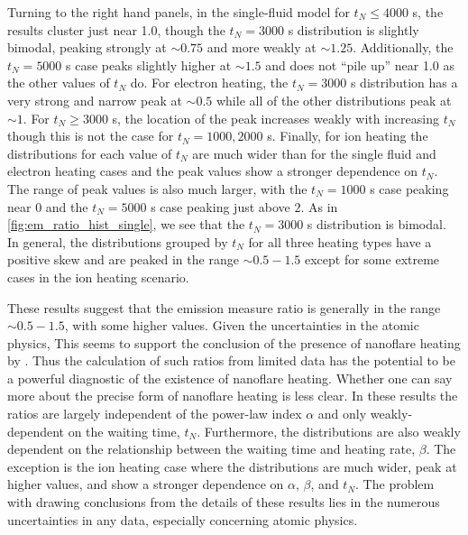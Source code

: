 \documentclass[preprint,linenumbers]{aastex}
\begin{document}
	\par Turning to the right hand panels, in the single-fluid model for $t_N\le4000$ s, the results cluster just near 1.0, though the $t_N=3000$ s distribution is slightly bimodal, peaking strongly at $\sim0.75$ and more weakly at $\sim1.25$. Additionally, the $t_N=5000$ s case peaks slightly higher at $\sim1.5$ and does not ``pile up'' near 1.0 as the other values of $t_N$ do. For electron heating, the $t_N=3000$ s distribution has a very strong and narrow peak at $\sim0.5$ while all of the other distributions peak at $\sim1$. For $t_N\ge3000$ s, the location of the peak increases weakly with increasing $t_N$ though this is not the case for $t_N=1000,2000$ s. Finally, for ion heating the distributions for each value of $t_N$ are much wider than for the single fluid and electron heating cases and the peak values show a stronger dependence on $t_N$. The range of peak values is also much larger, with the $t_N=1000$ s case peaking near 0 and the $t_N=5000$ s case peaking just above $2$. As in \autoref{fig:em_ratio_hist_single}, we see that the $t_N=3000$ s distribution is bimodal. In general, the distributions grouped by $t_N$ for all three heating types have a positive skew and are peaked in the range $\sim0.5-1.5$ except for some extreme cases in the ion heating scenario.
	\par These results suggest that the emission measure ratio is generally in the range $\sim0.5-1.5$, with some higher values. Given the uncertainties in the atomic physics, This seems to support the conclusion of the presence of nanoflare heating by \citet{brosius_pervasive_2014}. Thus the calculation of such ratios from limited data has the potential to be a powerful diagnostic of the existence of nanoflare heating. Whether one can say more about the precise form of nanoflare heating is less clear. In these results the ratios are largely independent of the power-law index $\alpha$ and only weakly-dependent on the waiting time, $t_N$. Furthermore, the distributions are also weakly dependent on the relationship between the waiting time and heating rate, $\beta$. The exception is the ion heating case where the distributions are much wider, peak at higher values, and show a stronger dependence on $\alpha$, $\beta$, and $t_N$. The problem with drawing conclusions from the details of these results lies in the numerous uncertainties in any data, especially concerning atomic physics.
\end{document}

